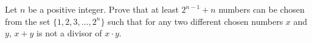 Let $n$ be a positive integer. Prove that at least $2^{n-1}+n$ numbers can be chosen from the set $\{1, 2, 3,\ldots ,2^n\}$ such that for any two different chosen numbers $x$ and $y$,  $x+y$ is not a divisor of $x\cdot y$.